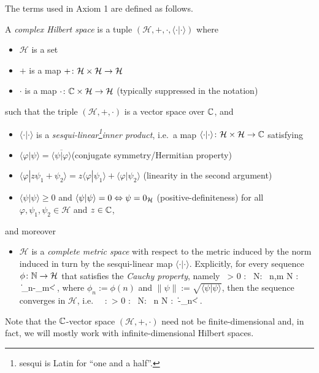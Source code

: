 The terms used in Axiom 1 are defined as follows.

\bd
A \emph{complex Hilbert space} is a tuple $(\mathcal{H},+,\cdot,\langle \cdot | \cdot \rangle)$ where
\begin{itemize}
\item $\mathcal{H}$ is a set
\item $+$ is a map $+\colon\mathcal{H}\times \mathcal{H}\to \mathcal{H}$
\item $\cdot$ is a map $\cdot \colon \mathbb{C} \times \mathcal{H}\to \mathcal{H}$ (typically suppressed in the notation)
\end{itemize}
such that the triple $(\mathcal{H},+,\cdot)$ is a vector space over $\mathbb{C}$, and
\begin{itemize}
\item $\langle \cdot | \cdot \rangle$ is a \emph{sesqui-linear\footnote{sesqui is Latin for ``one and a half''.}inner product}, i.e.\ a map $\langle \cdot | \cdot \rangle\colon\mathcal{H}\times \mathcal{H}\to \mathbb{C}$ satisfying
\ben[label=(\roman*)]
\item $\langle \varphi|\psi\rangle=\overline{\langle \psi|\varphi\rangle}$\hfill (conjugate symmetry/Hermitian property)
\item $\langle \varphi|z\psi_1+\psi_2\rangle=z\langle \varphi|\psi_1\rangle+\langle \varphi|\psi_2\rangle$ \hfill (linearity in the second argument)
\item $\langle \psi | \psi\rangle \geq 0$ and $\langle \psi|\psi\rangle = 0 \Leftrightarrow \psi = 0_{\mathcal{H}}$ \hfill (positive-definiteness)
\een
for all $\varphi,\psi_1,\psi_2\in\mathcal{H}$ and $z\in \mathbb{C}$,
\end{itemize}
and moreover
\begin{itemize}
\item $\mathcal{H}$ is a \emph{complete metric space} with respect to the metric induced by the norm induced in turn by the sesqui-linear map $\langle \cdot | \cdot \rangle$. Explicitly, for every sequence $\phi\colon \mathbb{N} \to \mathcal{H}$ that satisfies the \emph{Cauchy property}, namely
\bse
\forall \, \varepsilon > 0 : \exists \, N\in \N : \forall \, n,m \geq N : \ \|\phi_n-\phi_m\|< \varepsilon,
\ese
where $\phi_n:=\phi(n)$ and $\|\psi\|:=\sqrt{\langle \psi | \psi \rangle}$, then the sequence converges in $\mathcal{H}$, i.e.\
\bse
\exists \, \varphi\in{}:\forall \, \varepsilon > 0 : \exists \, N\in \N : \forall \, n \geq N : \ \|\varphi-\phi_n\|< \varepsilon.
\ese
\end{itemize}
\ed
Note that the $\mathbb{C}$-vector space $(\mathcal{H},+,\cdot)$ need not be finite-dimensional and, in fact, we will mostly work with infinite-dimensional Hilbert spaces. 

